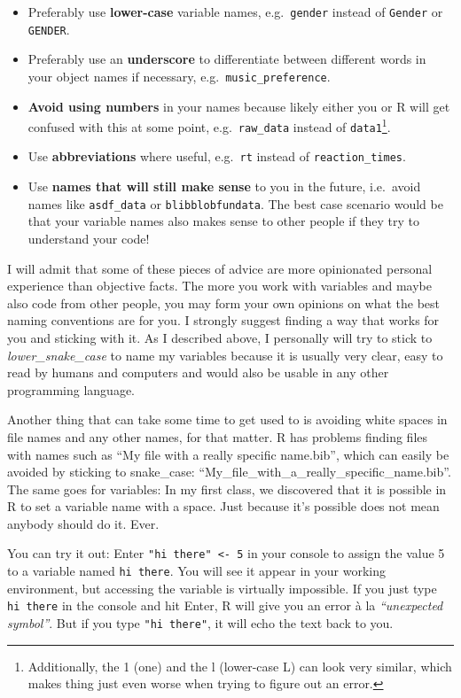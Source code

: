\documentclass[
]{book}
\providecommand{\tightlist}{%
  \setlength{\itemsep}{0pt}\setlength{\parskip}{0pt}}
\begin{document}
\begin{itemize}
\tightlist
\item
  Preferably use \textbf{lower-case} variable names, e.g.~\texttt{gender} instead of \texttt{Gender} or \texttt{GENDER}.
\item
  Preferably use an \textbf{underscore} to differentiate between different words in your object names if necessary, e.g.~\texttt{music\_preference}.
\item
  \textbf{Avoid using numbers} in your names because likely either you or R will get confused with this at some point, e.g.~\texttt{raw\_data} instead of \texttt{data1}\footnote{Additionally, the 1 (one) and the l (lower-case L) can look very similar, which makes thing just even worse when trying to figure out an error.}.
\item
  Use \textbf{abbreviations} where useful, e.g.~\texttt{rt} instead of \texttt{reaction\_times}.
\item
  Use \textbf{names that will still make sense} to you in the future, i.e.~avoid names like \texttt{asdf\_data} or \texttt{blibblobfundata}. The best case scenario would be that your variable names also makes sense to other people if they try to understand your code!
\end{itemize}

I will admit that some of these pieces of advice are more opinionated personal experience than objective facts.
The more you work with variables and maybe also code from other people, you may form your own opinions on what the best naming conventions are for you.
I strongly suggest finding a way that works for you and sticking with it.
As I described above, I personally will try to stick to \emph{lower\_snake\_case} to name my variables because it is usually very clear, easy to read by humans and computers and would also be usable in any other programming language.

Another thing that can take some time to get used to is avoiding white spaces in file names and any other names, for that matter.
R has problems finding files with names such as ``My file with a really specific name.bib'', which can easily be avoided by sticking to snake\_case: ``My\_file\_with\_a\_really\_specific\_name.bib''.
The same goes for variables: In my first class, we discovered that it is possible in R to set a variable name with a space.
Just because it's possible does not mean anybody should do it. Ever.

You can try it out: Enter \texttt{"hi\ there"\ \textless{}-\ 5} in your console to assign the value 5 to a variable named \texttt{hi\ there}.
You will see it appear in your working environment, but accessing the variable is virtually impossible.
If you just type \texttt{hi\ there} in the console and hit Enter, R will give you an error à la \emph{``unexpected symbol''}.
But if you type \texttt{"hi\ there"}, it will echo the text back to you.
\end{document}
